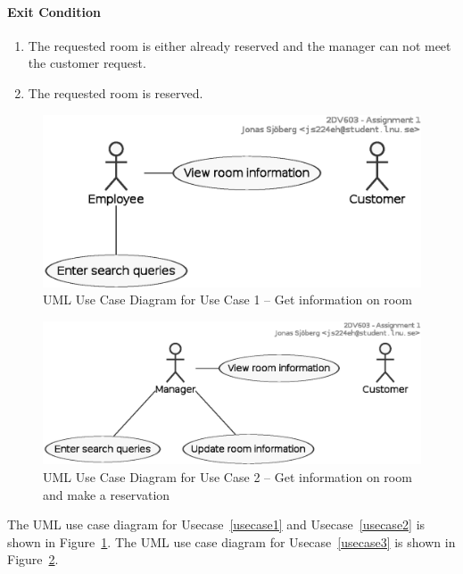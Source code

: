 \paragraph{Exit Condition}

\begin{enumerate}
\def\labelenumi{\arabic{enumi}.}
\tightlist
\item
  The requested room is either already reserved and the manager can not
  meet the customer request.
\item
  The requested room is reserved.
\end{enumerate}




\begin{figure}[htbp]
  \centering
  \includegraphics[width=0.8\linewidth]{include/usecase1.eps}
  \caption{UML Use Case Diagram for Use Case 1 -- Get information on room}
  \label{fig:uml-usecase1}
\end{figure}

\begin{figure}[htbp]
  \centering
  \includegraphics[width=0.8\linewidth]{include/usecase2.eps}
  \caption{UML Use Case Diagram for Use Case 2 -- Get information on room and make a reservation}
  \label{fig:uml-usecase2}
\end{figure}


The UML use case diagram for Usecase~\ref{usecase1} and Usecase~\ref{usecase2} is shown in Figure~\ref{fig:uml-usecase1}.
The UML use case diagram for Usecase~\ref{usecase3} is shown in Figure~\ref{fig:uml-usecase2}.


